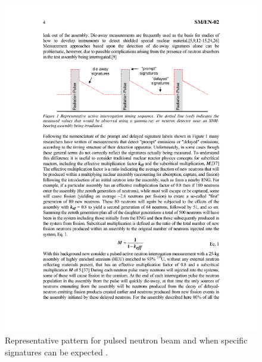 \documentclass{report}
\begin{document}
\begin{figure}[h]
 \centering
 \includegraphics[trim = 5cm 18.7cm 5cm 5cm, clip,scale=1]{./figures/Chichester_timing.pdf}
   \caption{Representative pattern for pulsed neutron beam and when specific signatures can be expected \cite{Chichester2009}.}
     \label{fig:Chichester_timing}
\end{figure}
\end{document}
